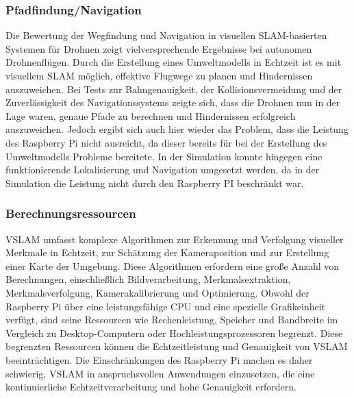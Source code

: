 \subsubsection{Pfadfindung/Navigation}

Die Bewertung der Wegfindung und Navigation in visuellen SLAM-basierten Systemen für Drohnen zeigt vielversprechende Ergebnisse bei autonomen Drohnenflügen. Durch die Erstellung eines Umweltmodells in Echtzeit ist es mit visuellem SLAM möglich, effektive Flugwege zu planen und Hindernissen auszuweichen. Bei Tests zur Bahngenauigkeit, der Kollisionsvermeidung und der Zuverlässigkeit des Navigationssystems zeigte sich, dass die Drohnen nun in der Lage waren, genaue Pfade zu berechnen und Hindernissen erfolgreich auszuweichen. Jedoch ergibt sich auch hier wieder das Problem, dass die Leistung des Raspberry Pi nicht ausreicht, da dieser bereits für bei der Erstellung des Umweltmodells Probleme bereitete. In der Simulation konnte hingegen eine funktionierende Lokalisierung und Navigation umgesetzt werden, da in der Simulation die Leistung nicht durch den Raspberry PI beschränkt war.

\subsubsection{Berechnungsressourcen}

\ac{VSLAM} umfasst komplexe Algorithmen zur Erkennung und Verfolgung visueller Merkmale in Echtzeit, zur Schätzung der Kameraposition und zur Erstellung einer Karte der Umgebung. Diese Algorithmen erfordern eine große Anzahl von Berechnungen, einschließlich Bildverarbeitung, Merkmalsextraktion, Merkmalsverfolgung, Kamerakalibrierung und Optimierung. Obwohl der Raspberry Pi über eine leistungsfähige CPU und eine spezielle Grafikeinheit verfügt, sind seine Ressourcen wie Rechenleistung, Speicher und Bandbreite im Vergleich zu Desktop-Computern oder Hochleistungsprozessoren begrenzt. Diese begrenzten Ressourcen können die Echtzeitleistung und Genauigkeit von \ac{VSLAM} beeinträchtigen. Die Einschränkungen des Raspberry Pi machen es daher schwierig, \ac{VSLAM} in anspruchsvollen Anwendungen einzusetzen, die eine kontinuierliche Echtzeitverarbeitung und hohe Genauigkeit erfordern.

